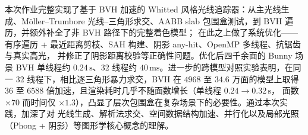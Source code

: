 \documentclass[11pt]{ctexart}
\begin{document}
本次作业完整实现了基于 BVH 加速的 Whitted 风格光线追踪器：从主光线生成、Möller–Trumbore
光线–三角形求交、AABB slab 包围盒测试，到 BVH 遍历，并额外补全了非 BVH 路径下的完整着色模型；
在此之上做了系统优化——有序遍历 + 最近距离剪枝、SAH 构建、阴影 any-hit、OpenMP 多线程、抗锯齿与真实高光，
并修正了阴影距离校验等正确性问题。优化后四千余面的 Bunny 场景 BVH 单线程约 $0.24\,\mathrm{s}$、32 线程约
$40\,\mathrm{ms}$。进一步的跨模型对照实验表明，在同一 32 线程下，相比逐三角形暴力求交，BVH 在 $4968$ 至
$34.6$ 万面的模型上取得 $36$ 至 $6588$ 倍加速，且渲染耗时几乎不随面数增长（单线程 $0.24\to0.32\,\mathrm{s}$，
面数 $\times70$ 而时间仅 $\times1.3$），凸显了层次包围盒在复杂场景下的必要性。通过本次实践，加深了对
光线生成、解析法求交、空间数据结构加速、并行化以及局部光照（Phong + 阴影）等图形学核心概念的理解。
\end{document}
